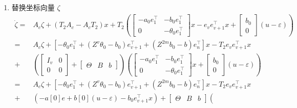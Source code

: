 \documentclass[a4paper,12pt]{article}
\begin{document}
\begin{enumerate}
    \item 替换坐标向量 $\zeta$
    \begin{align*}
        \dot{\zeta} = &   
        A_c \zeta + (T_2A_c-A_cT_2)x +
        T_2 \left(
        \left[
        \begin{array}{c|c}
        -a_0e_1^\top & -b_0e_1^\top\\ \hline
        0 & -\theta_0e_1^\top 
        \end{array}
        \right]
        x - e_ve_{v+1}^\top x + 
        \begin{bmatrix}
            b_0 \\ 0
        \end{bmatrix} 
        (u-\varepsilon)
        \right)
        \\ = &
        A_c \zeta + 
        [-{\theta_0}e_1^\top 
        +(Z^v{\theta_0}-{b_0})e_{v+1}^\top
        +(Z^{2m}{b_0}-{b})e_n^\top]x
        - T_2 e_ve_{v+1}^\top x
        \\ + & 
        \left( 
            \begin{bmatrix}
                I_{v} & 0 \\
                0 & 0
            \end{bmatrix} +
            \left[
            \begin{array}{c|cc}
            \Theta & B & b
            \end{array}
            \right]
        \right) 
        \left(
        \left[
        \begin{array}{c|c}
        -a_0e_1^\top & -b_0e_1^\top\\ \hline
        0 & -\theta_0e_1^\top 
        \end{array}
        \right]
        x + \begin{bmatrix}
            b_0 \\ 0
        \end{bmatrix} 
        (u-\varepsilon)
        \right)
        \\ = & 
        A_c \zeta + 
        [-{\theta_0}e_1^\top 
        +(Z^v{\theta_0}-{b_0})e_{v+1}^\top
        +(Z^{2m}{b_0}-{b})e_n^\top]x
        - T_2 e_ve_{v+1}^\top x
        \\ + & 
        \left(-a[0]e+b[0](u-\varepsilon)-b_0e_{v+1}^\top x\right) +
        \left[
        \begin{array}{c|cc}
        \Theta & B & b
        \end{array}
        \right]
        \left(

\end{align*}
\end{enumerate}
\end{document}
